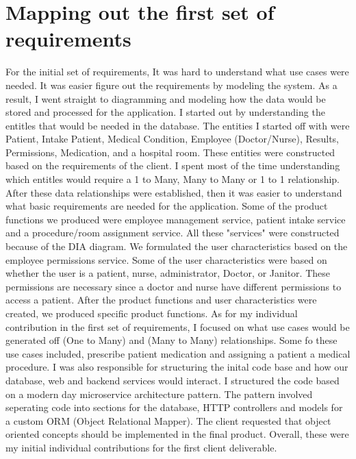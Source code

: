 \documentclass{article}
\begin{document}
\section{Mapping out the first set of requirements}
\begin{multicols}{2}
For the initial set of requirements, It was hard to understand what use cases were needed. It was easier figure out the requirements by modeling the system. As a result, I went straight to diagramming and modeling how the data would be stored and processed for the application. I started out by understanding the entitles that would be needed in the database. The entities I started off with were Patient, Intake Patient, Medical Condition, Employee (Doctor/Nurse), Results, Permissions, Medication, and a hospital room. These entities were constructed based on the requirements of the client. I spent most of the time understanding which entitles would require a 1 to Many, Many to Many or 1 to 1 relationship. After these data relationships were established, then it was easier to understand what basic requirements are needed for the application. Some of the product functions we produced were employee management service, patient intake service and a procedure/room assignment service. All these "services" were constructed because of the DIA diagram. We formulated the user characteristics based on the employee permissions service. Some of the user characteristics were based on whether the user is a patient, nurse, administrator, Doctor, or Janitor. These permissions are necessary since a doctor and nurse have different permissions to access a patient. After the product functions and user characteristics were created, we produced specific product functions. As for my individual contribution in the first set of requirements, I focused on what use cases would be generated off (One to Many) and (Many to Many) relationships. Some fo these use cases included, prescribe patient medication and assigning a patient a medical procedure. I was also responsible for structuring the inital code base and how our database, web and backend services would interact. I structured the code based on a modern day microservice architecture pattern. The pattern involved seperating code into sections for the database, HTTP controllers and models for a custom ORM (Object Relational Mapper). The client requested that object oriented concepts should be implemented in the final product. Overall, these were my initial individual contributions for the first client deliverable. 


\end{multicols}
\end{document}
